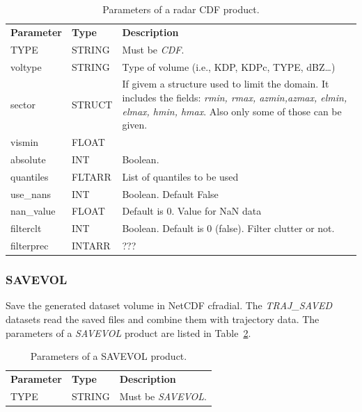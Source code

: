 \documentclass[a4paper,11pt,pdftex,twoside]{scrartcl}
\renewcommand{\bf}{\normalfont \bfseries}
\begin{document}
{{{\begin{table}[H]
 \begin{tabularx}{\textwidth}{llX}
 \bf{Parameter}  & \bf{Type}  & \bf{Description}\\
 TYPE           & STRING      & Must be \emph{CDF}.\\
 voltype        & STRING      & Type of volume (i.e., KDP, KDPc, TYPE, dBZ\dots)\\
 sector         & STRUCT      & If givem a structure used to limit the domain. It includes the fields:    \emph{rmin, rmax, azmin,azmax, elmin, elmax, hmin, hmax}. Also only some of those can be given. \\
 vismin        & FLOAT & \\
 absolute      & INT   & Boolean.  \\
 quantiles     & FLTARR & List of quantiles to be used \\
 use\_nans     & INT  & Boolean. Default False \\
 nan\_value    & FLOAT & Default is 0. Value for NaN data \\
 filterclt   & INT & Boolean. Default is 0 (false). Filter clutter or not. \\
 filterprec  & INTARR & ???\\
  \end{tabularx}
 \caption{Parameters of a radar CDF product.}
 \label{tab_product_cdf}
 \end{table}       
 
 \subsubsection{SAVEVOL}
 \label{subsec_savevol}

Save the generated dataset volume in NetCDF cfradial. The \emph{TRAJ\_SAVED} datasets
 read the saved files and combine them with trajectory data.
The parameters of a \emph{SAVEVOL} product are listed in Table~\ref{tab_product_savevol}.

\begin{table}[H]
 \begin{tabularx}{\textwidth}{llX}
 \bf{Parameter}  & \bf{Type}  & \bf{Description}\\
 TYPE           & STRING     & Must be \emph{SAVEVOL}.\\
 \end{tabularx}
 \caption{Parameters of a SAVEVOL product.}
 \label{tab_product_savevol}
 \end{table}

}}}
\end{document}
